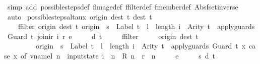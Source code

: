 \begin{isabellebody}
\ {\isacharparenleft}simp\ add{\isacharcolon}\ possible{\isacharunderscore}steps{\isacharunderscore}def\ fimage{\isacharunderscore}def\ ffilter{\isacharunderscore}def\ fmember{\isacharunderscore}def\ Abs{\isacharunderscore}fset{\isacharunderscore}inverse{\isacharparenright}\isanewline
\ \ \isamarkupfalse%
\ auto%
\endisatagproof
{\isafoldproof}%
%
\isadelimproof
\isanewline
%
\endisadelimproof
\isanewline
{}\isamarkupfalse%
\ possible{\isacharunderscore}steps{\isacharunderscore}alt{\isacharunderscore}aux{\isacharcolon}\ {\isachardoublequoteopen}{\isacharparenleft}{\isasymlambda}{\isacharparenleft}{\isacharparenleft}origin{\isacharcomma}\ dest{\isacharparenright}{\isacharcomma}\ t{\isacharparenright}{\isachardot}\ {\isacharparenleft}dest{\isacharcomma}\ t{\isacharparenright}{\isacharparenright}\ {\isacharbar}{\isacharbackquote}{\isacharbar}\isanewline
\ \ \ \ ffilter\ {\isacharparenleft}{\isasymlambda}{\isacharparenleft}{\isacharparenleft}origin{\isacharcomma}\ dest{\isacharparenright}{\isacharcomma}\ t{\isacharparenright}{\isachardot}\ origin\ {\isacharequal}\ s\ {\isasymand}\ Label\ t\ {\isacharequal}\ l\ {\isasymand}\ length\ i\ {\isacharequal}\ Arity\ t\ {\isasymand}\ apply{\isacharunderscore}guards\ {\isacharparenleft}Guard\ t{\isacharparenright}\ {\isacharparenleft}join{\isacharunderscore}ir\ i\ r{\isacharparenright}{\isacharparenright}\ e\ {\isacharequal}\isanewline
\ \ \ \ {\isacharbraceleft}{\isacharbar}{\isacharparenleft}d{\isacharcomma}\ t{\isacharparenright}{\isacharbar}{\isacharbraceright}\ {\isasymLongrightarrow}\isanewline
\ \ \ \ ffilter\isanewline
\ \ \ \ \ {\isacharparenleft}{\isasymlambda}{\isacharparenleft}{\isacharparenleft}origin{\isacharcomma}\ dest{\isacharparenright}{\isacharcomma}\ t{\isacharparenright}{\isachardot}\isanewline
\ \ \ \ \ \ \ \ \ origin\ {\isacharequal}\ s\ {\isasymand}\ Label\ t\ {\isacharequal}\ l\ {\isasymand}\ length\ i\ {\isacharequal}\ Arity\ t\ {\isasymand}\ apply{\isacharunderscore}guards\ {\isacharparenleft}Guard\ t{\isacharparenright}\ {\isacharparenleft}{\isasymlambda}x{\isachardot}\ case\ x\ of\ vname{\isachardot}I\ n\ {\isasymRightarrow}\ input{}state\ i\ {\isachardollar}\ n\ {\isacharbar}\ R\ n\ {\isasymRightarrow}\ r\ {\isachardollar}\ n{\isacharparenright}{\isacharparenright}\isanewline
\ \ \ \ \ e\ {\isacharequal}\isanewline
\ \ \ \ {\isacharbraceleft}{\isacharbar}{\isacharparenleft}{\isacharparenleft}s{\isacharcomma}\ d{\isacharparenright}{\isacharcomma}\ t{\isacharparenright}{\isacharbar}{\isacharbraceright}{\isachardoublequoteclose}\isanewline
%
\isadelimproof

\end{isabellebody}
